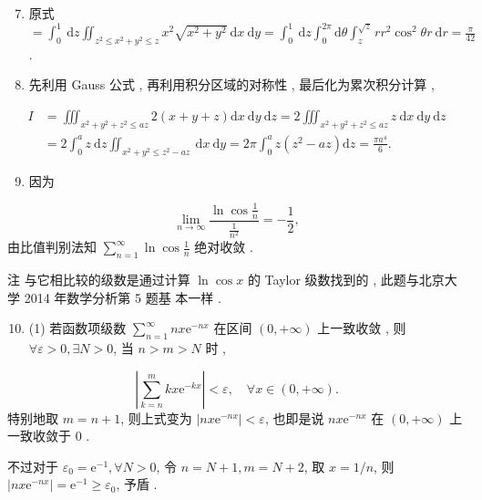 \documentclass[10pt]{article}
\begin{document}
\begin{enumerate}
  \setcounter{enumi}{6}
  \item  原式  $=\int_{0}^{1} \mathrm{~d} z \iint_{z^{2} \leqslant x^{2}+y^{2} \leqslant z} x^{2} \sqrt{x^{2}+y^{2}} \mathrm{~d} x \mathrm{~d} y=\int_{0}^{1} \mathrm{~d} z \int_{0}^{2 \pi} \mathrm{d} \theta \int_{z}^{\sqrt{z}} r r^{2} \cos ^{2} \theta r \mathrm{~d} r=\frac{\pi}{42}$.

  \item  先利用  Gauss  公式 ,  再利用积分区域的对称性 ,  最后化为累次积分计算 ,

\end{enumerate}
$$
\begin{aligned}
I &=\iiint_{x^{2}+y^{2}+z^{2} \leqslant a z} 2(x+y+z) \mathrm{d} x \mathrm{~d} y \mathrm{~d} z=2 \iiint_{x^{2}+y^{2}+z^{2} \leqslant a z} z \mathrm{~d} x \mathrm{~d} y \mathrm{~d} z \\
&=2 \int_{0}^{a} z \mathrm{~d} z \iint_{x^{2}+y^{2} \leqslant z^{2}-a z} \mathrm{~d} x \mathrm{~d} y=2 \pi \int_{0}^{a} z\left(z^{2}-a z\right) \mathrm{d} z=\frac{\pi a^{4}}{6} .
\end{aligned}
$$

\begin{enumerate}
  \setcounter{enumi}{8}
  \item  因为 
\end{enumerate}
$$
\lim _{n \rightarrow \infty} \frac{\ln \cos \frac{1}{n}}{\frac{1}{n^{2}}}=-\frac{1}{2},
$$
 由比值判别法知  $\sum_{n=1}^{\infty} \ln \cos \frac{1}{n}$  绝对收敛 .

 注   与它相比较的级数是通过计算  $\ln \cos x$  的  Taylor  级数找到的 ,  此题与北京大学  2014  年数学分析第  5  题基   本一样 .

\begin{enumerate}
  \setcounter{enumi}{9}
  \item (1)  若函数项级数  $\sum_{n=1}^{\infty} n x \mathrm{e}^{-n x}$  在区间  $(0,+\infty)$  上一致收敛 ,  则  $\forall \varepsilon>0, \exists N>0$,  当  $n>m>N$  时 ,
\end{enumerate}
$$
\left|\sum_{k=n}^{m} k x \mathrm{e}^{-k x}\right|<\varepsilon, \quad \forall x \in(0,+\infty) .
$$
 特别地取  $m=n+1$,  则上式变为  $\left|n x \mathrm{e}^{-n x}\right|<\varepsilon$,  也即是说  $n x \mathrm{e}^{-n x}$  在  $(0,+\infty)$  上一致收敛于  0 .

 不过对于  $\varepsilon_{0}=\mathrm{e}^{-1}, \forall N>0$,  令  $n=N+1, m=N+2$,  取  $x=1 / n$,  则  $\left|n x \mathrm{e}^{-n x}\right|=\mathrm{e}^{-1} \geqslant \varepsilon_{0}$,  予盾 .
\end{document}
